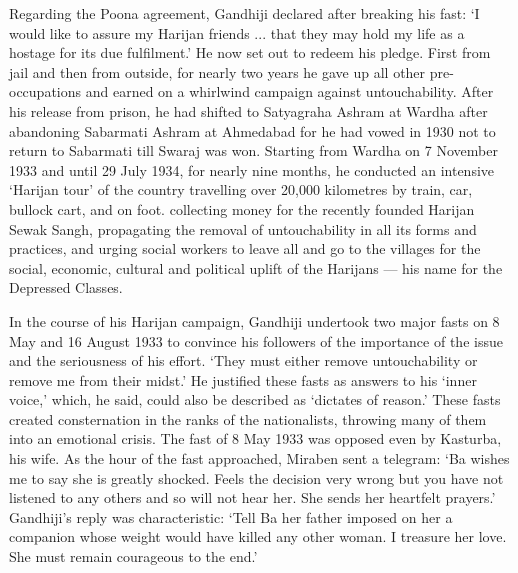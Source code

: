 Regarding the Poona agreement, Gandhiji declared after breaking his fast: `I would like to assure my Harijan friends ... that they may hold my life as a hostage for its due fulfilment.' He now set out to redeem his pledge. First from jail and then from outside, for nearly two years he gave up all other pre-occupations and earned on a whirlwind campaign against untouchability. After his release from prison, he had shifted to Satyagraha Ashram at Wardha after abandoning Sabarmati Ashram at Ahmedabad for he had vowed in 1930 not to return to Sabarmati till Swaraj was won. Starting from Wardha on 7 November 1933 and until 29 July 1934, for nearly nine months, he conducted an intensive `Harijan tour' of the country travelling over 20,000 kilometres by train, car, bullock cart, and on foot. collecting money for the recently founded Harijan Sewak Sangh, propagating the removal of untouchability in all its forms and practices, and urging social workers to leave all and go to the villages for the social, economic, cultural and political uplift of the Harijans — his name for the Depressed Classes. 

In the course of his Harijan campaign, Gandhiji undertook two major fasts on 8 May and 16 August 1933 to convince his followers of the importance of the issue and the seriousness of his effort. `They must either remove untouchability or remove me from their midst.' He justified these fasts as answers to his `inner voice,' which, he said, could also be described as `dictates of reason.' These fasts created consternation in the ranks of the nationalists, throwing many of them into an emotional crisis. The fast of 8 May 1933 was opposed even by Kasturba, his wife. As the hour of the fast approached, Miraben sent a telegram: `Ba wishes me to say she is greatly shocked. Feels the decision very wrong but you have not listened to any others and so will not hear her. She sends her heartfelt prayers.' Gandhiji's reply was characteristic: `Tell Ba her father imposed on her a companion whose weight would have killed any other woman. I treasure her love. She must remain courageous to the end.' 

